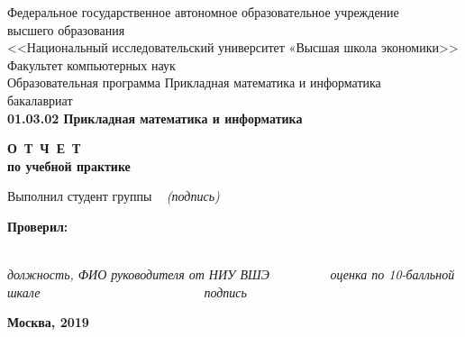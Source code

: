 \documentclass{article}
\begin{document}
\large
\parindent=0cm
\pagestyle{empty}
\begin{center}
\onehalfspacing
Федеральное государственное автономное образовательное учреждение\\
высшего образования\\
<<Национальный исследовательский университет «Высшая школа экономики>>\\
Факультет компьютерных наук\\
Образовательная программа Прикладная математика и информатика\\
бакалавриат\\
{\bfseries 01.03.02 Прикладная математика и информатика}
\end{center}
\begin{center}
\bfseries
О\ Т\ Ч\ Е\ Т\\
по учебной практике
\end{center}
\bigbreak
\bigbreak
\bigbreak
\bigbreak
\bigbreak
\bigbreak
\bigbreak
\bigbreak
\begin{flushright} 
Выполнил студент группы \underline{\hspace{0.75cm}}
\break
\break
\underline{\hspace{5cm}} \
\bigbreak
\bigbreak
\underline{\hspace{5cm}}
\break
\textit{(подпись)} \ \ \ \ \ \ \ \ \ \ \ \ \ \
\end{flushright}
\bigbreak
\bigbreak
\bigbreak
\bigbreak
\bigbreak
\bigbreak
\bigbreak
\bigbreak
\bigbreak
\bigbreak
\bigbreak
\bigbreak
\begin{flushleft}
\bfseries
Проверил:
\end{flushleft}
\bigbreak
\bigbreak
\bigbreak
\begin{center}
\underline{\hspace{7.2cm}}\ \ \ \ \ \ \ \underline{\hspace{4.4cm}} \ \ \ \ \ \ \ \ \underline{\hspace{4cm}}\\
\small
\textit{должность, ФИО руководителя от НИУ ВШЭ} \ \ \ \ \ \ \ \ \ \textit{оценка по 10-балльной шкале}\ \ \ \ \ \ \ \ \ \ \ \ \ \ \ \ \ \ \ \ \ \ \ \ \ \ \textit{подпись}\ \ \ \ \ \ \ \ \ \ \ \ \ \ \ \ \  
\end{center}
\bigbreak
\bigbreak
\bigbreak
\bigbreak
\bigbreak
\bigbreak
\begin{center}
\bfseries Москва, 2019
\end{center}
\end{document}
